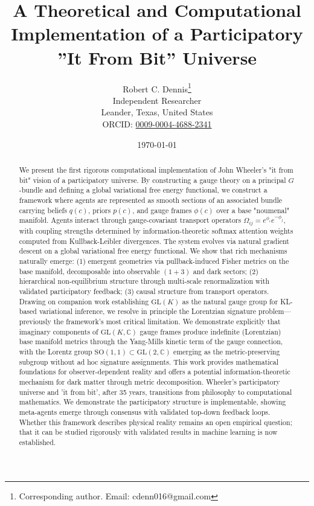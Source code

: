 \documentclass[11pt]{article}
\begin{document}
\title{A Theoretical and Computational Implementation of a Participatory ”It From Bit” Universe}

\author{
  Robert C. Dennis\thanks{Corresponding author. Email: cdenn016@gmail.com}\\[0.3cm]
  \small Independent Researcher\\
  \small Leander, Texas, United States\\[0.2cm]
  \small ORCID: \href{https://orcid.org/0009-0004-4688-2341}{0009-0004-4688-2341} %
}

\date{\today}

\maketitle


\begin{abstract}
We present the first rigorous computational implementation of John Wheeler's "it from bit" vision of a participatory universe. By constructing a gauge theory on a principal $G$-bundle and defining a global variational free energy functional, we construct a framework where agents are represented as smooth sections of an associated bundle carrying beliefs $q(c)$, priors $p(c)$, and gauge frames $\phi(c)$ over a base "noumenal" manifold. Agents interact through gauge-covariant transport operators $\Omega_{ij} = e^{\phi_i}e^{-\phi_j}$, with coupling strengths determined by information-theoretic softmax attention weights computed from Kullback-Leibler divergences. The system evolves via natural gradient descent on a global variational free energy functional. We show that rich mechanisms naturally emerge: (1) emergent geometries via pullback-induced Fisher metrics on the base manifold, decomposable into observable $(1+3)$ and dark sectors; (2) hierarchical non-equilibrium structure through multi-scale renormalization with validated participatory feedback; (3) causal structure from transport operators. Drawing on companion work establishing $\mathrm{GL}(K)$ as the natural gauge group for KL-based variational inference, we resolve in principle the Lorentzian signature problem---previously the framework's most critical limitation. We demonstrate explicitly that imaginary components of $\mathrm{GL}(K, \mathbb{C})$ gauge frames produce indefinite (Lorentzian) base manifold metrics through the Yang-Mills kinetic term of the gauge connection, with the Lorentz group $\mathrm{SO}(1,1) \subset \mathrm{GL}(2, \mathbb{C})$ emerging as the metric-preserving subgroup without ad hoc signature assignments. This work provides mathematical foundations for observer-dependent reality and offers a potential information-theoretic mechanism for dark matter through metric decomposition. Wheeler's participatory universe and 'it from bit', after 35 years, transitions from philosophy to computational mathematics. We demonstrate the participatory structure is implementable, showing meta-agents emerge through consensus with validated top-down feedback loops. Whether this framework describes physical reality remains an open empirical question; that it can be studied rigorously with validated results in machine learning is now established.
\end{abstract}
\end{document}
